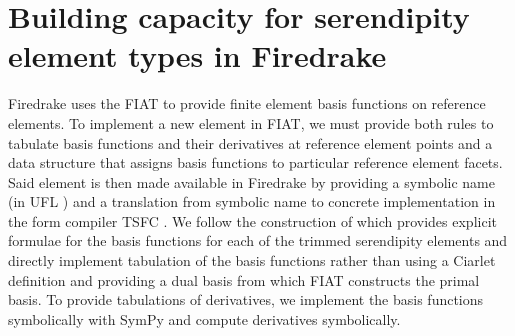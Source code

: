 \documentclass[format=acmsmall,screen,timestamp=false,a4paper]{acmart}
\DeclareMathOperator{\Div}{div}
\DeclareMathOperator{\curl}{curl}
\newcommand\akg[1]{\textbf{\textcolor[rgb]{.5,0,1}{[Andrew: #1]}}}
\newcommand\lm[1]{\textbf{\textcolor[rgb]{1,0,0.5}{[Lawrence: #1]}}}
\newcommand\rck[1]{\textbf{\textcolor[rgb]{1,0.5,0.5}{[Rob: #1]}}}
\newcommand{\hcurl}{\ensuremath{{H}(\curl)}\xspace}
\newcommand{\hdiv}{\ensuremath{{H}(\Div)}\xspace}
\begin{document}
  
  
  \section{Building capacity for serendipity element types in Firedrake}
  \label{sec:buildcap}

  Firedrake uses the FIAT \cite{kirby2004algorithm,kirby2012fiat} to provide finite element basis functions on reference elements. 
  To implement a new element in FIAT, we must provide both rules to tabulate basis functions and their derivatives at reference element points and a data structure that assigns basis functions to particular reference element facets.
  Said element is then made available in Firedrake by providing a symbolic name (in UFL \cite{alnaes2014unified}) and a translation from symbolic name to concrete implementation in the form compiler TSFC \cite{homolya2018tsfc}. We follow the construction of \cite{gillette2019computational} which provides explicit formulae for the basis functions for each of the trimmed serendipity elements and directly implement tabulation of the basis functions rather than using a Ciarlet definition and providing a dual basis from which FIAT constructs the primal basis. To provide tabulations of derivatives, we implement the basis functions symbolically with SymPy \cite{sympy2017} and compute derivatives symbolically. %
  
\end{document}
